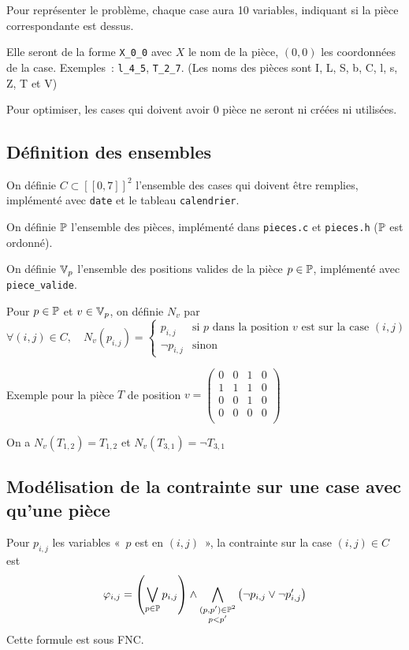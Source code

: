 Pour représenter le problème, chaque case aura 10 variables,
indiquant si la pièce correspondante est dessus.

Elle seront de la forme \verb|X_0_0| avec $X$ le nom de la pièce, $(0,0)$ les
coordonnées de la case.
Exemples~: \verb|l_4_5|, \verb|T_2_7|. (Les noms des pièces sont I, L, S, b, C,
l, s, Z, T et V)

Pour optimiser, les cases qui doivent avoir 0 pièce ne seront ni créées ni
utilisées.

\subsection{Définition des ensembles}
On définie $C \subset [\![0,7]\!]^2$ l'ensemble des cases qui doivent être remplies,
implémenté avec \verb|date| et le tableau \verb|calendrier|.

On définie $\mathbb{P}$ l'ensemble des pièces, implémenté dans \verb|pieces.c| et \verb|pieces.h|
($\mathbb{P}$ est ordonné).

On définie $\mathbb{V}_p$ l'ensemble des positions valides de la pièce $p\in\mathbb{P}$,
implémenté avec \verb|piece_valide|.

Pour $p\in\mathbb{P}$ et $v\in\mathbb{V}_p$, on définie $N_v$ par
\begin{equation*}
    \forall (i,j)\in C,\quad N_v(p_{i,j}) =
        \begin{cases}
            p_{i,j} & \text{si $p$ dans la position $v$ est sur la case $(i,j)$}\\
            \lnot p_{i,j} & \text{sinon}
        \end{cases}
\end{equation*}

Exemple pour la pièce $T$ de position $v =
    \begin{pmatrix}
        0 & 0 & 1 & 0 \\
        1 & 1 & 1 & 0 \\
        0 & 0 & 1 & 0 \\
        0 & 0 & 0 & 0 \\
    \end{pmatrix}$

On a $N_v(T_{1,2}) = T_{1,2}$ et $N_v(T_{3,1}) = \lnot T_{3,1}$

\subsection{Modélisation de la contrainte sur une case avec qu'une pièce}
Pour $p_{i,j}$ les variables «~$p$ est en $(i,j)$~», la contrainte sur la case $(i,j)\in C$ est
\begin{equation*}
    \varphi_{i,j} = \left(\bigvee_{p\in\mathbb{P}} p_{i,j} \right) \land
                    \bigwedge_{\substack{(p,p')\in\mathbb{P}^2\\p<p'}}\left(\lnot p_{i,j} \lor \lnot p'_{i,j}\right)
\end{equation*}
Cette formule est sous FNC.

